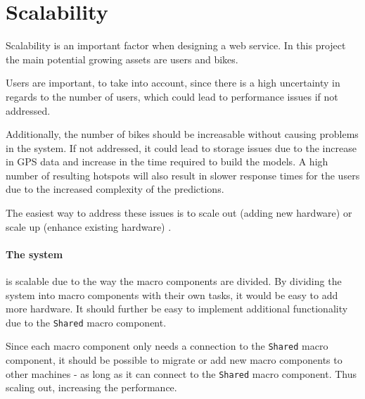 \section{Scalability}
Scalability is an important factor when designing a web service. In this project the main potential growing assets are users and bikes.

Users are important, to take into account, since there is a high uncertainty in regards to the number of users, which could lead to performance issues if not addressed.

Additionally, the number of bikes should be increasable without causing problems in the system. If not addressed, it could lead to storage issues due to the increase in GPS data and increase in the time required to build the models.
A high number of resulting hotspots will also result in slower response times for the users due to the increased complexity of the predictions.

The easiest way to address these issues is to scale out (adding new hardware) or scale up (enhance existing hardware) \cite{michael2007scale}. 

\paragraph{The system} is scalable due to the way the macro components are divided. By dividing the system into macro components with their own tasks, it would be easy to add more hardware. It should further be easy to implement additional functionality due to the \texttt{Shared} macro component.

Since each macro component only needs a connection to the \texttt{Shared} macro component, it should be possible to migrate or add new macro components to other machines - as long as it can connect to the \texttt{Shared} macro component. Thus scaling out, increasing the performance.